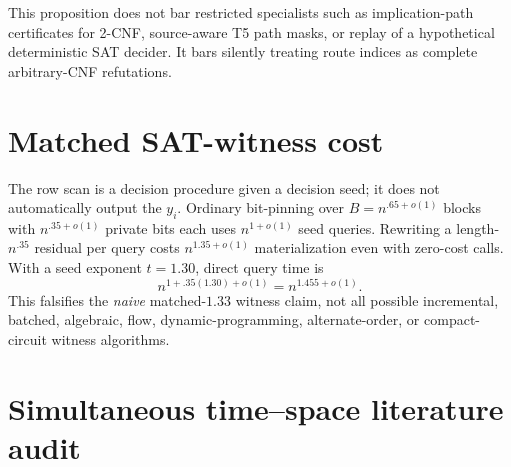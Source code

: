 \documentclass[11pt]{article}
\begin{document}
This proposition does not bar restricted specialists such as implication-path certificates for 2-CNF, source-aware T5 path masks, or replay of a hypothetical deterministic SAT decider.  It bars silently treating route indices as complete arbitrary-CNF refutations.

\section{Matched SAT-witness cost}

The row scan is a decision procedure given a decision seed; it does not automatically output the $y_i$.  Ordinary bit-pinning over $B=n^{.65+o(1)}$ blocks with $n^{.35+o(1)}$ private bits each uses $n^{1+o(1)}$ seed queries.  Rewriting a length-$n^{.35}$ residual per query costs $n^{1.35+o(1)}$ materialization even with zero-cost calls.  With a seed exponent $t=1.30$, direct query time is
\[
 n^{1+.35(1.30)+o(1)}=n^{1.455+o(1)}.
\]
This falsifies the \emph{naive} matched-$1.33$ witness claim, not all possible incremental, batched, algebraic, flow, dynamic-programming, alternate-order, or compact-circuit witness algorithms.

\section{Simultaneous time--space literature audit}
\end{document}
